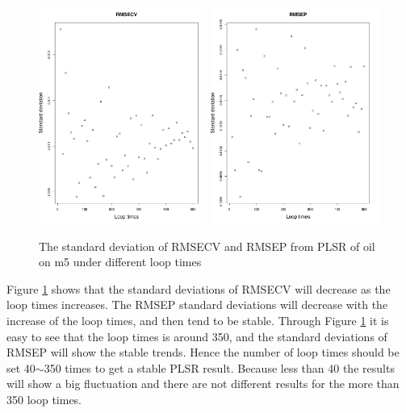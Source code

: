 \documentclass[a4paper,12pt,titlepage]{article} %
\numberwithin{equation}{section}  %
\begin{document}
	 
	\begin{figure}[]    %
		\centering           %
		\includegraphics[width=5.5cm, angle=0]{sd_RMSECV_loop_times_500.pdf}  %
		\includegraphics[width=5.5cm, angle=0]{sd_RMSEP_loop_times_500.pdf} %
		\caption{The standard deviation of RMSECV and RMSEP from PLSR of oil on m5 under different loop times}          %
		\label{fig:sd_RMSECV_loop_times_500}               %
	\end{figure}                        %
	
	
	Figure \ref{fig:sd_RMSECV_loop_times_500} shows that the standard deviations of RMSECV will decrease as the loop times increases. The RMSEP standard deviations will decrease with the increase of the loop times, and then tend to be stable. Through Figure \ref{fig:sd_RMSECV_loop_times_500} it is easy to see that the loop times is around 350, and the standard deviations of RMSEP will show the stable trends. Hence the number of loop times should be set 40$\sim$350 times to get a stable PLSR result. Because less than 40 the results will show a big fluctuation and there are not different results for the more than 350 loop times.
	
\end{document}
